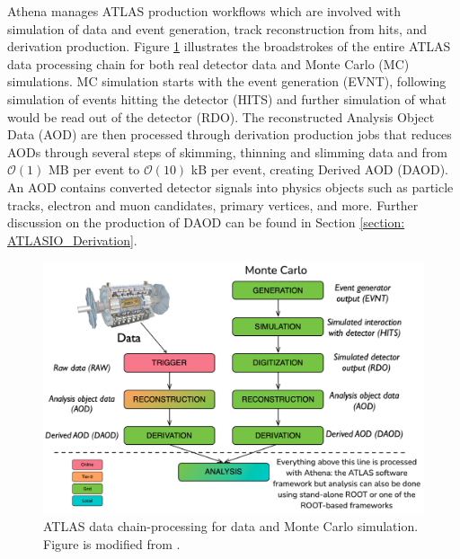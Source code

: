 Athena manages ATLAS production workflows which are involved with simulation of data and event generation, track reconstruction from hits, and derivation production.\cite{athenadocs}
Figure \ref{fig:ATLAS_data_chain} illustrates the broadstrokes of the entire ATLAS data processing chain for both real detector data and Monte Carlo (MC) simulations. 
MC simulation starts with the event generation (EVNT), following simulation of events hitting the detector (HITS) and further simulation of what would be read out of the detector (RDO).
The reconstructed Analysis Object Data (AOD) are then processed through derivation production jobs that reduces AODs through several steps of skimming, thinning and slimming data and from $\mathcal{O}(1)$ MB per event to $\mathcal{O}(10)$ kB per event, creating Derived AOD (DAOD).
An AOD contains converted detector signals into physics objects such as particle tracks, electron and muon candidates, primary vertices, and more.\cite{Aad:2895022}
Further discussion on the production of DAOD can be found in Section \ref{section: ATLASIO_Derivation}.
\begin{figure}[ht]
    \centering
    \vspace{20px}
    \includegraphics[width=\textwidth]{content/img/modified-James-chain-processing.png}
    \caption{ATLAS data chain-processing for data and Monte Carlo simulation. Figure is modified from \cite{James_Catmore_chain_processing}.}
    \vspace{20px}
    \label{fig:ATLAS_data_chain}
\end{figure}



